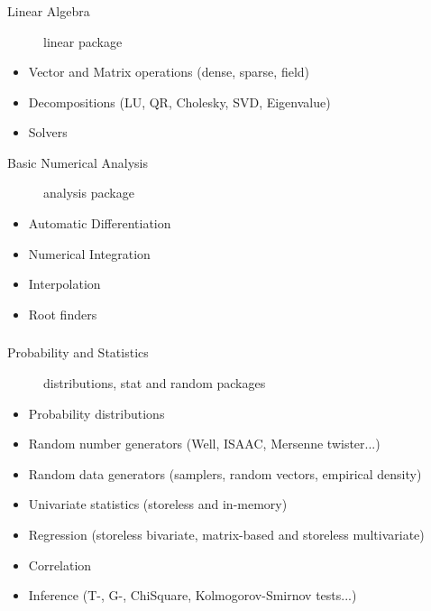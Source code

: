 \documentclass[14pt,mathserif]{beamer}
\begin{document}
\begin{frame}
  \frametitle{}
  
\begin{description}
  \item[Linear Algebra] linear package 
\end{description}

\begin{small}
\begin{itemize}
  \item Vector and Matrix operations (dense, sparse, field)
  \item Decompositions (LU, QR, Cholesky, SVD, Eigenvalue)
  \item Solvers
\end{itemize}
\end{small}

\begin{description}
  \item[Basic Numerical Analysis] analysis package
\end{description}

\begin{small}
\begin{itemize}
  \item Automatic Differentiation
  \item Numerical Integration
  \item Interpolation
  \item Root finders
\end{itemize}
\end{small}


\end{frame}

\begin{frame}
  \frametitle{}

\begin{description}
  \item[Probability and Statistics] distributions, stat and random packages
\end{description}

\begin{small}
\begin{itemize}
  \item Probability distributions
  \item Random number generators (Well, ISAAC, Mersenne twister...)
  \item Random data generators (samplers, random vectors, empirical density)
  \item Univariate statistics (storeless and in-memory)
  \item Regression (storeless bivariate, matrix-based and storeless multivariate)
  \item Correlation
  \item Inference (T-, G-, ChiSquare, Kolmogorov-Smirnov tests...)  
\end{itemize}
\end{small}
\end{frame}
\end{document}
